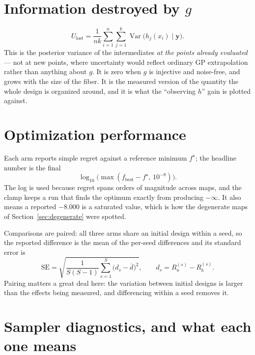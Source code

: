 \documentclass[11pt]{article}
\newcommand{\Ulost}{U_{\text{lost}}}
\begin{document}
\section{Information destroyed by $g$}

\begin{equation}
\Ulost=\frac{1}{nk}\sum_{i=1}^{n}\sum_{j=1}^{k}
\operatorname{Var}\bigl(h_j(x_i)\mid \mathbf{y}\bigr).
\end{equation}
This is the posterior variance of the intermediates \emph{at the points already
evaluated} --- not at new points, where uncertainty would reflect ordinary GP
extrapolation rather than anything about $g$. It is zero when $g$ is injective
and noise-free, and grows with the size of the fiber. It is the measured version
of the quantity the whole design is organized around, and it is what the
``observing $h$'' gain is plotted against.

\section{Optimization performance}

Each arm reports simple regret against a reference minimum $f^\star$; the
headline number is the final
\begin{equation}
\log_{10}\bigl(\max(f_{\text{best}}-f^\star,\,10^{-8})\bigr).
\end{equation}
The log is used because regret spans orders of magnitude across maps, and the
clamp keeps a run that finds the optimum exactly from producing $-\infty$. It
also means a reported $-8.000$ is a saturated value, which is how the degenerate
maps of Section~\ref{sec:degenerate} were spotted.

Comparisons are paired: all three arms share an initial design within a seed, so
the reported difference is the mean of the per-seed differences and its standard
error is
\begin{equation}
\mathrm{SE}=\sqrt{\frac{1}{S(S-1)}\sum_{s=1}^{S}\bigl(d_s-\bar d\bigr)^2},
\qquad d_s=R_a^{(s)}-R_b^{(s)} .
\end{equation}
Pairing matters a great deal here: the variation between initial designs is
larger than the effects being measured, and differencing within a seed removes
it.

\section{Sampler diagnostics, and what each one means}
\end{document}
